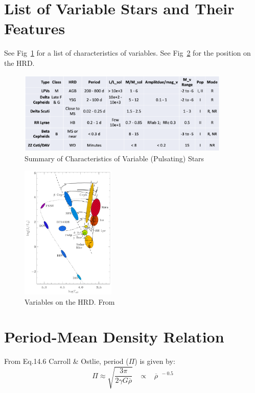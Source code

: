 \documentclass{spy}
\begin{document}
\section{List of Variable Stars and Their Features}
See Fig~\ref{variables_list_table} for a list of characteristics of variables. See Fig~\ref{hrd_variables_diagram} for the position on the HRD.

\begin{figure}[h]
    \centering
    \includegraphics[width=0.9\textwidth]{variables_list.eps}
    \caption{Summary of Characteristics of Variable (Pulsating) Stars}   
    \label{variables_list_table}
\end{figure}

\begin{figure}[ht]
    \centering
    \includegraphics[width=0.4\textwidth]{hrd_variables.eps}
    \caption{Variables on the HRD. From \citet{MiraVariablesPeriod}}
    \label{hrd_variables_diagram}
\end{figure}

\section{Period-Mean Density Relation}
From Eq.14.6 Carroll \& Ostlie, period (\(\Pi\)) is given by:
\begin{equation}
    \Pi \approx \sqrt{\frac{3 \pi}{2 \gamma G \overline{\rho}}}
    \;\;\; \propto \;\;\; \overline{\rho}^{\;\;-0.5}
\end{equation}
\end{document}
